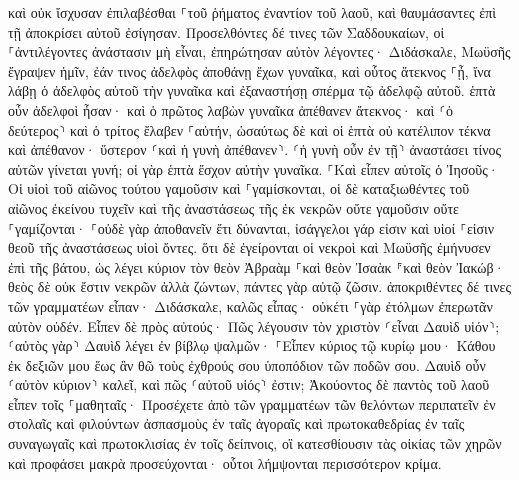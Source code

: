 \documentclass[twoside, 9pt]{extreport}
\begin{document}
καὶ οὐκ ἴσχυσαν ἐπιλαβέσθαι ⸀τοῦ ῥήματος ἐναντίον τοῦ λαοῦ, καὶ θαυμάσαντες ἐπὶ τῇ ἀποκρίσει αὐτοῦ ἐσίγησαν. 
Προσελθόντες δέ τινες τῶν Σαδδουκαίων, οἱ ⸀ἀντιλέγοντες ἀνάστασιν μὴ εἶναι, ἐπηρώτησαν αὐτὸν 
λέγοντες· Διδάσκαλε, Μωϋσῆς ἔγραψεν ἡμῖν, ἐάν τινος ἀδελφὸς ἀποθάνῃ ἔχων γυναῖκα, καὶ οὗτος ἄτεκνος ⸀ᾖ, ἵνα λάβῃ ὁ ἀδελφὸς αὐτοῦ τὴν γυναῖκα καὶ ἐξαναστήσῃ σπέρμα τῷ ἀδελφῷ αὐτοῦ. 
ἑπτὰ οὖν ἀδελφοὶ ἦσαν· καὶ ὁ πρῶτος λαβὼν γυναῖκα ἀπέθανεν ἄτεκνος· 
καὶ ⸂ὁ δεύτερος⸃ 
καὶ ὁ τρίτος ἔλαβεν ⸀αὐτήν, ὡσαύτως δὲ καὶ οἱ ἑπτὰ οὐ κατέλιπον τέκνα καὶ ἀπέθανον· 
ὕστερον ⸂καὶ ἡ γυνὴ ἀπέθανεν⸃. 
⸂ἡ γυνὴ οὖν ἐν τῇ⸃ ἀναστάσει τίνος αὐτῶν γίνεται γυνή; οἱ γὰρ ἑπτὰ ἔσχον αὐτὴν γυναῖκα. 
⸀Καὶ εἶπεν αὐτοῖς ὁ Ἰησοῦς· Οἱ υἱοὶ τοῦ αἰῶνος τούτου γαμοῦσιν καὶ ⸀γαμίσκονται, 
οἱ δὲ καταξιωθέντες τοῦ αἰῶνος ἐκείνου τυχεῖν καὶ τῆς ἀναστάσεως τῆς ἐκ νεκρῶν οὔτε γαμοῦσιν οὔτε ⸀γαμίζονται· 
⸀οὐδὲ γὰρ ἀποθανεῖν ἔτι δύνανται, ἰσάγγελοι γάρ εἰσιν καὶ υἱοί ⸀εἰσιν θεοῦ τῆς ἀναστάσεως υἱοὶ ὄντες. 
ὅτι δὲ ἐγείρονται οἱ νεκροὶ καὶ Μωϋσῆς ἐμήνυσεν ἐπὶ τῆς βάτου, ὡς λέγει κύριον τὸν θεὸν Ἀβραὰμ ⸀καὶ θεὸν Ἰσαὰκ ⸁καὶ θεὸν Ἰακώβ· 
θεὸς δὲ οὐκ ἔστιν νεκρῶν ἀλλὰ ζώντων, πάντες γὰρ αὐτῷ ζῶσιν. 
ἀποκριθέντες δέ τινες τῶν γραμματέων εἶπαν· Διδάσκαλε, καλῶς εἶπας· 
οὐκέτι ⸀γὰρ ἐτόλμων ἐπερωτᾶν αὐτὸν οὐδέν. 
Εἶπεν δὲ πρὸς αὐτούς· Πῶς λέγουσιν τὸν χριστὸν ⸂εἶναι Δαυὶδ υἱόν⸃; 
⸂αὐτὸς γὰρ⸃ Δαυὶδ λέγει ἐν βίβλῳ ψαλμῶν· ⸀Εἶπεν κύριος τῷ κυρίῳ μου· Κάθου ἐκ δεξιῶν μου 
ἕως ἂν θῶ τοὺς ἐχθρούς σου ὑποπόδιον τῶν ποδῶν σου. 
Δαυὶδ οὖν ⸂αὐτὸν κύριον⸃ καλεῖ, καὶ πῶς ⸂αὐτοῦ υἱός⸃ ἐστιν; 
Ἀκούοντος δὲ παντὸς τοῦ λαοῦ εἶπεν τοῖς ⸀μαθηταῖς· 
Προσέχετε ἀπὸ τῶν γραμματέων τῶν θελόντων περιπατεῖν ἐν στολαῖς καὶ φιλούντων ἀσπασμοὺς ἐν ταῖς ἀγοραῖς καὶ πρωτοκαθεδρίας ἐν ταῖς συναγωγαῖς καὶ πρωτοκλισίας ἐν τοῖς δείπνοις, 
οἳ κατεσθίουσιν τὰς οἰκίας τῶν χηρῶν καὶ προφάσει μακρὰ προσεύχονται· οὗτοι λήμψονται περισσότερον κρίμα. 
\end{document}
